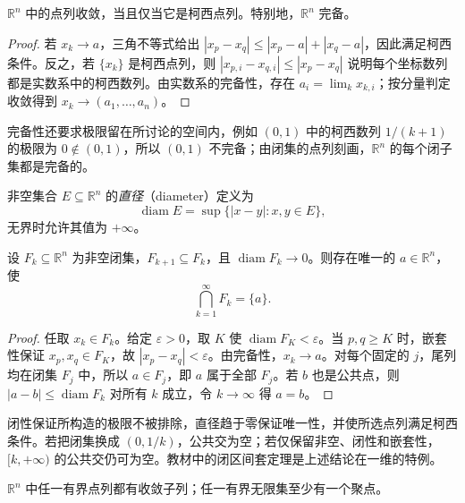 \begin{theorem}[欧氏空间的完备性]
\label{thm:euclidean-completeness}
$\mathbb R^n$ 中的点列收敛，当且仅当它是柯西点列。特别地，$\mathbb R^n$ 完备。
\end{theorem}

\begin{proof}
若 $x_k\to a$，三角不等式给出 $|x_p-x_q|\leq|x_p-a|+|x_q-a|$，因此满足柯西条件。反之，若 $\{x_k\}$ 是柯西点列，则 $|x_{p,i}-x_{q,i}|\leq|x_p-x_q|$ 说明每个坐标数列都是实数系中的柯西数列。由实数系的完备性，存在 $a_i=\lim_kx_{k,i}$；按分量判定收敛得到 $x_k\to(a_1,\ldots,a_n)$。
\end{proof}

完备性还要求极限留在所讨论的空间内，例如 $(0,1)$ 中的柯西数列 $1/(k+1)$ 的极限为 $0\notin(0,1)$，所以 $(0,1)$ 不完备；由闭集的点列刻画，$\mathbb R^n$ 的每个闭子集都是完备的。

\begin{definition}
\label{def:euclidean-set-diameter}
非空集合 $E\subseteq\mathbb R^n$ 的\emph{直径}（diameter）定义为
\[
    \operatorname{diam}E=\sup\{|x-y|:x,y\in E\},
\]
无界时允许其值为 $+\infty$。
\end{definition}

\begin{theorem}[闭集套定理]
\label{thm:euclidean-nested-closed-sets}
设 $F_k\subseteq\mathbb R^n$ 为非空闭集，$F_{k+1}\subseteq F_k$，且 $\operatorname{diam}F_k\to0$。则存在唯一的 $a\in\mathbb R^n$，使
\[
    \bigcap_{k=1}^\infty F_k=\{a\}.
\]
\end{theorem}

\begin{proof}
任取 $x_k\in F_k$。给定 $\varepsilon>0$，取 $K$ 使 $\operatorname{diam}F_K<\varepsilon$。当 $p,q\geq K$ 时，嵌套性保证 $x_p,x_q\in F_K$，故 $|x_p-x_q|<\varepsilon$。由完备性，$x_k\to a$。对每个固定的 $j$，尾列均在闭集 $F_j$ 中，所以 $a\in F_j$，即 $a$ 属于全部 $F_j$。若 $b$ 也是公共点，则 $|a-b|\leq\operatorname{diam}F_k$ 对所有 $k$ 成立，令 $k\to\infty$ 得 $a=b$。
\end{proof}

闭性保证所构造的极限不被排除，直径趋于零保证唯一性，并使所选点列满足柯西条件。若把闭集换成 $(0,1/k)$，公共交为空；若仅保留非空、闭性和嵌套性，$[k,+\infty)$ 的公共交仍可为空。教材中的闭区间套定理是上述结论在一维的特例。

\begin{theorem}
\label{thm:euclidean-bolzano-weierstrass}
$\mathbb R^n$ 中任一有界点列都有收敛子列；任一有界无限集至少有一个聚点。
\end{theorem}

